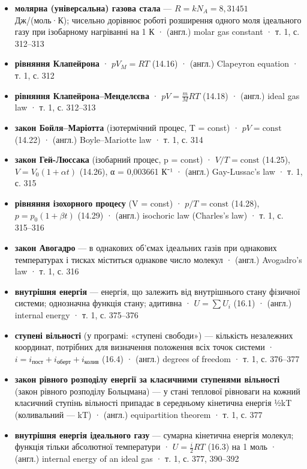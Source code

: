 \documentclass[11pt,a4paper,oneside]{book}
\newcommand{\book}{}
\begin{document}
\begin{itemize}
\item \textbf{молярна (універсальна) газова стала} — $R = kN_A = 8{,}31451$ Дж/(моль·К); чисельно дорівнює роботі розширення одного моля ідеального газу при ізобарному нагріванні на 1 К · (англ.) molar gas constant · \book{} т. 1, с. 312–313
\item \textbf{рівняння Клапейрона} · $pV_M = RT$ (14.16) · (англ.) Clapeyron equation · \book{} т. 1, с. 312
\item \textbf{рівняння Клапейрона–Менделєєва} · $pV = \tfrac mM RT$ (14.18) · (англ.) ideal gas law · \book{} т. 1, с. 312–313
\item \textbf{закон Бойля–Маріотта} (ізотермічний процес, T = const) · $pV = \text{const}$ (14.22) · (англ.) Boyle–Mariotte law · \book{} т. 1, с. 314
\item \textbf{закон Гей-Люссака} (ізобарний процес, p = const) · $V/T = \text{const}$ (14.25), $V = V_0(1+\alpha t)$ (14.26), α = 0,003661 К⁻¹ · (англ.) Gay-Lussac's law · \book{} т. 1, с. 315
\item \textbf{рівняння ізохорного процесу} (V = const) · $p/T = \text{const}$ (14.28), $p = p_0(1+\beta t)$ (14.29) · (англ.) isochoric law (Charles's law) · \book{} т. 1, с. 315–316
\item \textbf{закон Авогадро} — в однакових об'ємах ідеальних газів при однакових температурах і тисках міститься однакове число молекул · (англ.) Avogadro's law · \book{} т. 1, с. 316
\item \textbf{внутрішня енергія} — енергія, що залежить від внутрішнього стану фізичної системи; однозначна функція стану; адитивна · $U = \sum U_i$ (16.1) · (англ.) internal energy · \book{} т. 1, с. 375–376
\item \textbf{ступені вільності} (у програмі: «ступені свободи») — кількість незалежних координат, потрібних для визначення положення всіх точок системи · $i = i_{\text{пост}}+i_{\text{оберт}}+i_{\text{колив}}$ (16.4) · (англ.) degrees of freedom · \book{} т. 1, с. 376–377
\item \textbf{закон рівного розподілу енергії за класичними ступенями вільності} (закон рівного розподілу Больцмана) — у стані теплової рівноваги на кожний класичний ступінь вільності припадає в середньому кінетична енергія ½kT (коливальний — kT) · (англ.) equipartition theorem · \book{} т. 1, с. 377
\item \textbf{внутрішня енергія ідеального газу} — сумарна кінетична енергія молекул; функція тільки абсолютної температури · $U = \tfrac i2RT$ (16.3) на 1 моль · (англ.) internal energy of an ideal gas · \book{} т. 1, с. 377, 390–392
\end{itemize}
\end{document}
